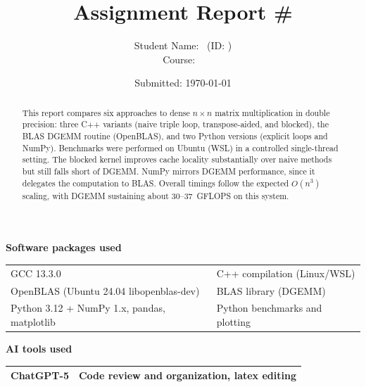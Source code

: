 \documentclass[11pt,a4paper]{article}
\title{Assignment Report \#\assignmentnumber \\ \assignmenttitle}
\author{Student Name: \studentname\ (ID: \studentid) \\ Course: \coursecode\ \coursename}
\date{Submitted: \today}
\begin{document}
	\maketitle
	
	\begin{center}
		\textbf{Software packages used} \\[0.25em]
		\begin{tabular}{|l|l|}
			\hline
			GCC 13.3.0 & C++ compilation (Linux/WSL) \\
			OpenBLAS (Ubuntu 24.04 libopenblas-dev) & BLAS library (DGEMM) \\
			Python 3.12 + NumPy 1.x, pandas, matplotlib & Python benchmarks and plotting \\
			\hline
		\end{tabular}
	\end{center}
	
	\begin{center}
		\textbf{AI tools used} \\[0.25em]
		\begin{tabular}{|l|l|}
			\hline
			ChatGPT-5 & Code review and organization, latex editing \\
			\hline
		\end{tabular}
	\end{center}
	\vspace{1em}
	
	
	\begin{abstract}
		This report compares six approaches to dense $n \times n$ matrix multiplication in double precision: three C++ variants (naive triple loop, transpose-aided, and blocked), the BLAS DGEMM routine (OpenBLAS), and two Python versions (explicit loops and NumPy). Benchmarks were performed on Ubuntu (WSL) in a controlled single-thread setting. The blocked kernel improves cache locality substantially over naive methods but still falls short of DGEMM. NumPy mirrors DGEMM performance, since it delegates the computation to BLAS. Overall timings follow the expected $O(n^3)$ scaling, with DGEMM sustaining about 30--37~GFLOPS on this system. 
	\end{abstract}
	
	
\end{document}
